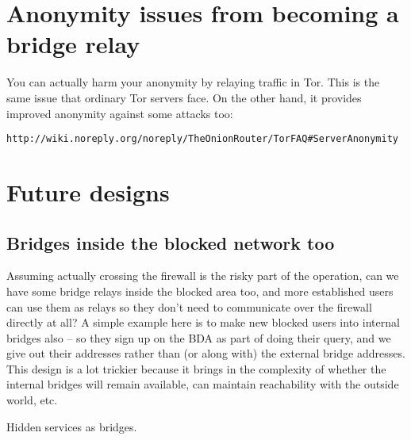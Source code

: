 \documentclass{llncs}
\begin{document}
\section{Anonymity issues from becoming a bridge relay}

You can actually harm your anonymity by relaying traffic in Tor.  This is
the same issue that ordinary Tor servers face. On the other hand, it
provides improved anonymity against some attacks too:

\begin{verbatim}
http://wiki.noreply.org/noreply/TheOnionRouter/TorFAQ#ServerAnonymity
\end{verbatim}

\section{Future designs}

\subsection{Bridges inside the blocked network too}

Assuming actually crossing the firewall is the risky part of the
operation, can we have some bridge relays inside the blocked area too,
and more established users can use them as relays so they don't need to
communicate over the firewall directly at all? A simple example here is
to make new blocked users into internal bridges also -- so they sign up
on the BDA as part of doing their query, and we give out their addresses
rather than (or along with) the external bridge addresses. This design
is a lot trickier because it brings in the complexity of whether the
internal bridges will remain available, can maintain reachability with
the outside world, etc.

Hidden services as bridges.

% 
\end{document}

